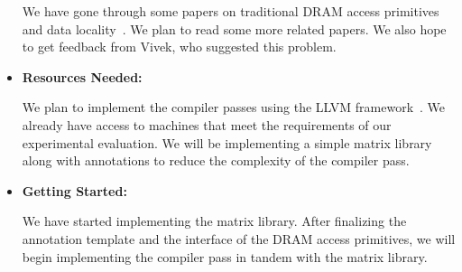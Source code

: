 \documentclass[letterpaper]{article}
\begin{document}
\begin{itemize}
We have gone through some papers on traditional DRAM access primitives and data
locality~\cite{dram1,dram2}. We plan to read some more related papers.
We also hope to get feedback from Vivek, who suggested this problem.

\item \textbf{Resources Needed:}

We plan to implement the compiler passes using the LLVM framework~\cite{llvm}.
We already have access to machines that meet the requirements of our
experimental evaluation. We will be implementing a simple matrix library along with
annotations to reduce the complexity of the compiler pass.

\item \textbf{Getting Started:}

We have started implementing the matrix library. After finalizing 
the annotation template and the interface of the DRAM access primitives, 
we will begin implementing the compiler pass in tandem with the matrix
library.
  
\end{itemize}



\end{document}

